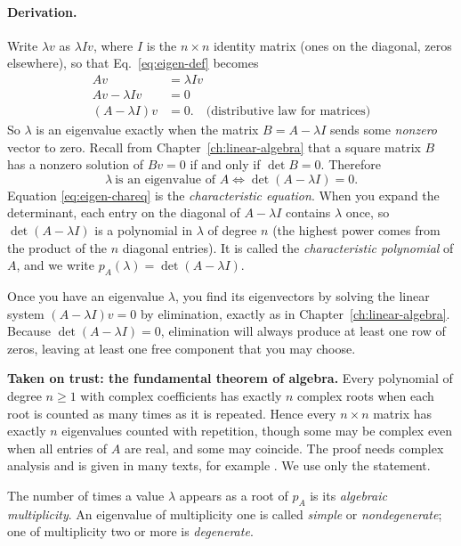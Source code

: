 \paragraph{Derivation.} Write $\lambda v$ as $\lambda I v$, where $I$ is the $n\times n$ identity matrix (ones on the diagonal, zeros elsewhere), so that Eq.~\eqref{eq:eigen-def} becomes
\begin{align}
Av&=\lambda Iv\\
Av-\lambda Iv&=0\\
(A-\lambda I)v&=0.\quad\text{(distributive law for matrices)}
\label{eq:eigen-homog}
\end{align}
So $\lambda$ is an eigenvalue exactly when the matrix $B=A-\lambda I$ sends some \emph{nonzero} vector to zero. Recall from Chapter~\ref{ch:linear-algebra} that a square matrix $B$ has a nonzero solution of $Bv=0$ if and only if $\det B=0$. Therefore
\begin{equation}
\boxed{\lambda\ \text{is an eigenvalue of }A\iff\det(A-\lambda I)=0.}
\label{eq:eigen-chareq}
\end{equation}
Equation \eqref{eq:eigen-chareq} is the \emph{characteristic equation}. When you expand the determinant, each entry on the diagonal of $A-\lambda I$ contains $\lambda$ once, so $\det(A-\lambda I)$ is a polynomial in $\lambda$ of degree $n$ (the highest power comes from the product of the $n$ diagonal entries). It is called the \emph{characteristic polynomial} of $A$, and we write $p_A(\lambda)=\det(A-\lambda I)$.

Once you have an eigenvalue $\lambda$, you find its eigenvectors by solving the linear system $(A-\lambda I)v=0$ by elimination, exactly as in Chapter~\ref{ch:linear-algebra}. Because $\det(A-\lambda I)=0$, elimination will always produce at least one row of zeros, leaving at least one free component that you may choose.

\begin{beyond}
\textbf{Taken on trust: the fundamental theorem of algebra.} Every polynomial of degree $n\ge1$ with complex coefficients has exactly $n$ complex roots when each root is counted as many times as it is repeated. Hence every $n\times n$ matrix has exactly $n$ eigenvalues counted with repetition, though some may be complex even when all entries of $A$ are real, and some may coincide. The proof needs complex analysis and is given in many texts, for example \cite{rhb}. We use only the statement.
\end{beyond}

The number of times a value $\lambda$ appears as a root of $p_A$ is its \emph{algebraic multiplicity}. An eigenvalue of multiplicity one is called \emph{simple} or \emph{nondegenerate}; one of multiplicity two or more is \emph{degenerate}.

